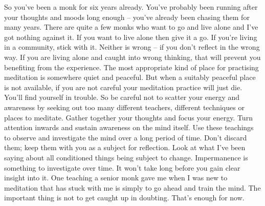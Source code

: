 So you've been a monk for six years already. You've probably been running after your thoughts and moods long enough -- you've already been chasing them for many years. There are quite a few monks who want to go and live alone and I've got nothing against it. If you want to live alone then give it a go. If you're living in a community, stick with it. Neither is wrong -- if you don't reflect in the wrong way. If you are living alone and caught into wrong thinking, that will prevent you benefiting from the experience. The most appropriate kind of place for practising meditation is somewhere quiet and peaceful. But when a suitably peaceful place is not available, if you are not careful your meditation practice will just die. You'll find yourself in trouble. So be careful not to scatter your energy and awareness by seeking out too many different teachers, different techniques or places to meditate. Gather together your thoughts and focus your energy. Turn attention inwards and sustain awareness on the mind itself. Use these teachings to observe and investigate the mind over a long period of time. Don't discard them; keep them with you as a subject for reflection. Look at what I've been saying about all conditioned things being subject to change. Impermanence is something to investigate over time. It won't take long before you gain clear insight into it. One teaching a senior monk gave me when I was new to meditation that has stuck with me is simply to go ahead and train the mind. The important thing is not to get caught up in doubting. That's enough for now.
